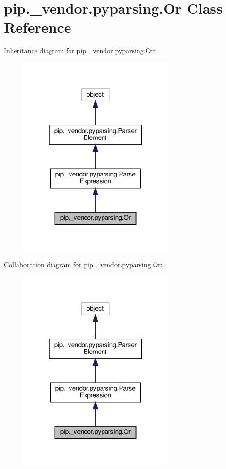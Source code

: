 \hypertarget{classpip_1_1__vendor_1_1pyparsing_1_1Or}{}\section{pip.\+\_\+vendor.\+pyparsing.\+Or Class Reference}
\label{classpip_1_1__vendor_1_1pyparsing_1_1Or}


Inheritance diagram for pip.\+\_\+vendor.\+pyparsing.\+Or\+:
\nopagebreak
\begin{figure}[H]
\begin{center}
\leavevmode
\includegraphics[width=223pt]{classpip_1_1__vendor_1_1pyparsing_1_1Or__inherit__graph}
\end{center}
\end{figure}


Collaboration diagram for pip.\+\_\+vendor.\+pyparsing.\+Or\+:
\nopagebreak
\begin{figure}[H]
\begin{center}
\leavevmode
\includegraphics[width=223pt]{classpip_1_1__vendor_1_1pyparsing_1_1Or__coll__graph}
\end{center}
\end{figure}
